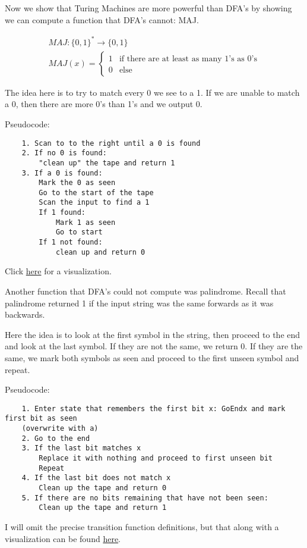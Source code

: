 \begin{example}
    Now we show that Turing Machines are more powerful than DFA's by showing we can compute a function that DFA's cannot: MAJ.

    \begin{gather*}
        MAJ:\{0, 1\}^* \rightarrow \{0, 1\} \\
        MAJ(x) = 
        \begin{cases}
            1 & \text{if there are at least as many 1's as 0's} \\
            0 & \text{else}
        \end{cases}
    \end{gather*}
    
    The idea here is to try to match every 0 we see to a 1. If we are unable to match a 0, then there are more 0's than 1's and we output 0. 
    
    Pseudocode:
    \begin{verbatim}
    1. Scan to to the right until a 0 is found
    2. If no 0 is found:
        "clean up" the tape and return 1
    3. If a 0 is found:
        Mark the 0 as seen 
        Go to the start of the tape
        Scan the input to find a 1
        If 1 found:
            Mark 1 as seen
            Go to start
        If 1 not found:
            clean up and return 0
    \end{verbatim}
    
    Click \href{http://turingmachinesimulator.com/shared/ftcgvwwbaj}{here} for a visualization.   
\end{example}

\begin{example}
    Another function that DFA's could not compute was palindrome. Recall that palindrome returned 1 if the input string was the same forwards as it was backwards.

    Here the idea is to look at the first symbol in the string, then proceed to the end and look at the last symbol. If they are not the same, we return 0. If they are the same, we mark both symbols as seen and proceed to the first unseen symbol and repeat. 

    Pseudocode:
    \begin{verbatim}
    1. Enter state that remembers the first bit x: GoEndx and mark first bit as seen 
    (overwrite with a)
    2. Go to the end
    3. If the last bit matches x 
        Replace it with nothing and proceed to first unseen bit
        Repeat
    4. If the last bit does not match x
        Clean up the tape and return 0
    5. If there are no bits remaining that have not been seen:
        Clean up the tape and return 1
    \end{verbatim}

    I will omit the precise transition function definitions, but that along with a visualization can be found \href{http://turingmachinesimulator.com/shared/mngibtvnaj}{here}. 
\end{example}

